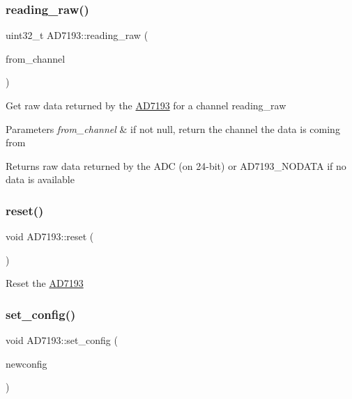 \subsubsection{\texorpdfstring{reading\+\_\+raw()}{reading\_raw()}}
{\footnotesize\ttfamily uint32\+\_\+t A\+D7193\+::reading\+\_\+raw (\begin{DoxyParamCaption}\item[{A\+D7193\+::channel\+\_\+t $\ast$}]{from\+\_\+channel }\end{DoxyParamCaption})}

Get raw data returned by the \hyperlink{classAD7193}{A\+D7193} for a channel  reading\+\_\+raw 
\begin{DoxyParams}{Parameters}
{\em from\+\_\+channel} & if not null, return the channel the data is coming from \\
\hline
\end{DoxyParams}
\begin{DoxyReturn}{Returns}
raw data returned by the A\+DC (on 24-\/bit) or A\+D7193\+\_\+\+N\+O\+D\+A\+TA if no data is available 
\end{DoxyReturn}
\mbox{\label{classAD7193_a5b1bbfb3b90e7034bba4f14c397ebcb4}} 
\subsubsection{\texorpdfstring{reset()}{reset()}}
{\footnotesize\ttfamily void A\+D7193\+::reset (\begin{DoxyParamCaption}\item[{void}]{ }\end{DoxyParamCaption})}

Reset the \hyperlink{classAD7193}{A\+D7193} \mbox{\label{classAD7193_a5b066aba7096fb2db5d91661a46862da}} 
\subsubsection{\texorpdfstring{set\+\_\+config()}{set\_config()}}
{\footnotesize\ttfamily void A\+D7193\+::set\+\_\+config (\begin{DoxyParamCaption}\item[{\hyperlink{structAD7193_1_1config__t}{A\+D7193\+::config\+\_\+t} $\ast$}]{newconfig }\end{DoxyParamCaption})}

